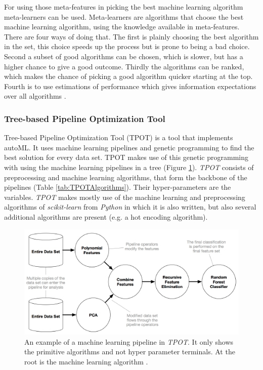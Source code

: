 \documentclass[10pt,a4paper]{report}
\begin{document}
	For using those meta-features in picking the best machine learning algorithm meta-learners can be used. Meta-learners are algorithms that choose the best machine learning algorithm, using the knowledge available in meta-features. There are four ways of doing that. The first is plainly choosing the best algorithm in the set, this choice speeds up the process but is prone to being a bad choice. Second a subset of good algorithms can be chosen, which is slower, but has a higher chance to give a good outcome. Thirdly the algorithms can be ranked, which makes the chance of picking a good algorithm quicker starting at the top. Fourth is to use estimations of performance which gives information expectations over all algorithms \cite{brazdil2009development}.
	
	\subsubsection{Tree-based Pipeline Optimization Tool}
	\label{FSsubsec:TPOT}
	
	Tree-based Pipeline Optimization Tool (TPOT) is a tool that implements autoML. It uses machine learning pipelines and genetic programming to find the best solution for every data set. TPOT makes use of this genetic programming with using the machine learning pipelines in a tree (Figure \ref{fig:MachineLearningPipeline}). \textit{TPOT} consists of preprocessing and machine learning algorithms, that form the backbone of the pipelines (Table \ref{tab:TPOTAlgorithms}). Their hyper-parameters are the variables. \textit{TPOT} makes mostly use of the machine learning and preprocessing algorithms of \textit{scikit-learn} from \textit{Python} in which it is also written, but also several additional algorithms are present (e.g. a hot encoding algorithm).
	
	\begin{figure}[]
		\includegraphics[scale=1]{MachineLearningPipeline.png}
		\caption{An example of a machine learning pipeline in \textit{TPOT}. It only shows the primitive algorithms and not hyper parameter terminals. At the root is the machine learning algorithm \cite{Gijsbers2017Thesis}.}
		\label{fig:MachineLearningPipeline}
	\end{figure}
	
\end{document}

